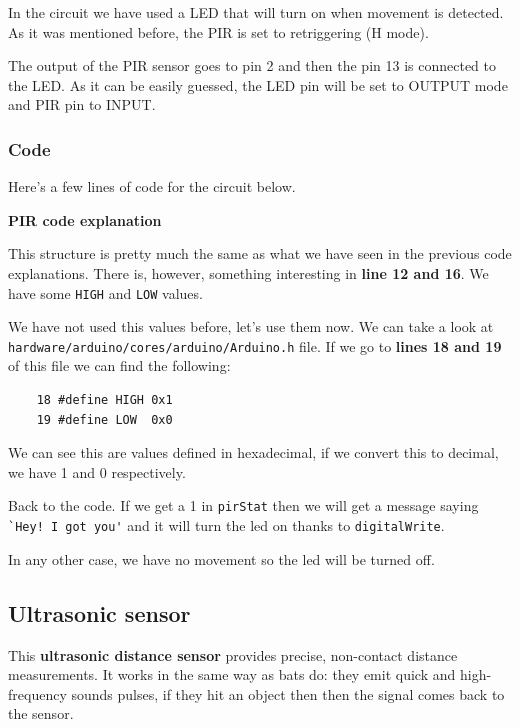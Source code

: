 In the circuit we have used a LED that will turn on when movement is detected. As it was mentioned before, the PIR is set to retriggering (H mode).

The output of the PIR sensor goes to pin 2 and then the pin 13 is connected to the LED. As it can be easily guessed, the LED pin will be set to OUTPUT mode and PIR pin to INPUT.


\vspace{7mm}
\subsubsection{Code}
Here's a few lines of code for the circuit below.



\vspace{5mm}
\textbf{PIR code explanation}

This structure is pretty much the same as what we have seen in the previous code explanations. There is, however, something interesting in \textbf{line 12 and 16}. We have some \verb|HIGH| and \verb|LOW| values.

We have not used this values before, let's use them now. We can take a look at \verb|hardware/arduino/cores/arduino/Arduino.h| file. If we go to \textbf{lines 18 and 19} of this file we can find the following:
\begin{verbatim}
    18 #define HIGH 0x1
    19 #define LOW  0x0
\end{verbatim}
We can see this are values defined in hexadecimal, if we convert this to decimal, we have 1 and 0 respectively.

Back to the code. If we get a 1 in \verb|pirStat| then we will get a message saying \verb|`Hey! I got you'| and it will turn the led on thanks to \verb|digitalWrite|.

In any other case, we have no movement so the led will be turned off.

\vspace{7mm}
\subsection{Ultrasonic sensor}
This \textbf{ultrasonic distance sensor} provides precise, non-contact distance measurements. It works in the same way as bats do: they emit quick and high-frequency sounds pulses, if they hit an object then then the signal comes back to the sensor.

